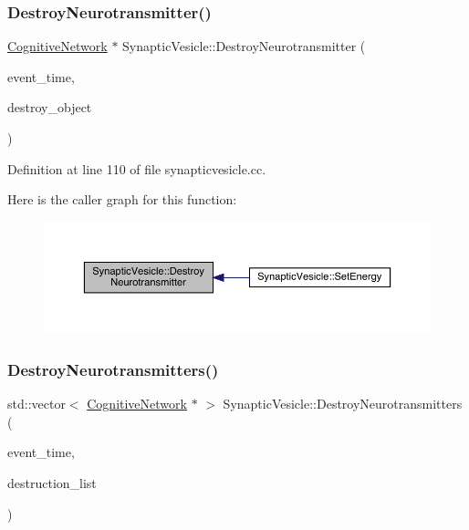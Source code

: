 \subsubsection{\texorpdfstring{Destroy\+Neurotransmitter()}{DestroyNeurotransmitter()}}
{\footnotesize\ttfamily \hyperlink{class_cognitive_network}{Cognitive\+Network} $\ast$ Synaptic\+Vesicle\+::\+Destroy\+Neurotransmitter (\begin{DoxyParamCaption}\item[{std\+::chrono\+::time\+\_\+point$<$ \hyperlink{universe_8h_a0ef8d951d1ca5ab3cfaf7ab4c7a6fd80}{Clock} $>$}]{event\+\_\+time,  }\item[{\hyperlink{class_cognitive_network}{Cognitive\+Network} $\ast$}]{destroy\+\_\+object }\end{DoxyParamCaption})}



Definition at line 110 of file synapticvesicle.\+cc.

Here is the caller graph for this function\+:\nopagebreak
\begin{figure}[H]
\begin{center}
\leavevmode
\includegraphics[width=350pt]{class_synaptic_vesicle_a5ab4ecfb4a880bc729078f5529c547bc_icgraph}
\end{center}
\end{figure}
\mbox{\label{class_synaptic_vesicle_a37817cc68b212d89ef8aa08c73631cbb}} 
\subsubsection{\texorpdfstring{Destroy\+Neurotransmitters()}{DestroyNeurotransmitters()}}
{\footnotesize\ttfamily std\+::vector$<$ \hyperlink{class_cognitive_network}{Cognitive\+Network} $\ast$ $>$ Synaptic\+Vesicle\+::\+Destroy\+Neurotransmitters (\begin{DoxyParamCaption}\item[{std\+::chrono\+::time\+\_\+point$<$ \hyperlink{universe_8h_a0ef8d951d1ca5ab3cfaf7ab4c7a6fd80}{Clock} $>$}]{event\+\_\+time,  }\item[{std\+::vector$<$ \hyperlink{class_cognitive_network}{Cognitive\+Network} $\ast$$>$}]{destruction\+\_\+list }\end{DoxyParamCaption})}



